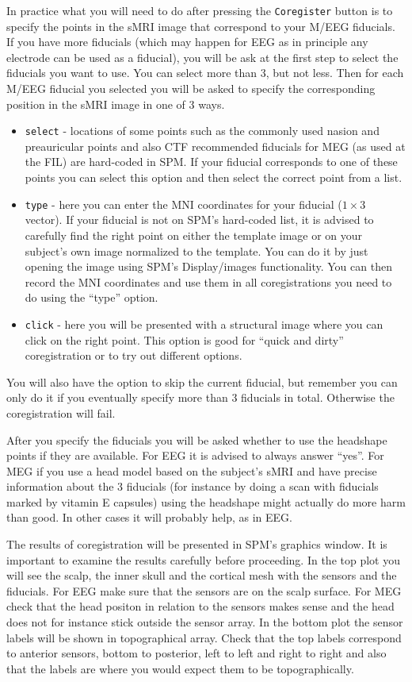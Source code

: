In practice what you will need to do after pressing  the \texttt{Coregister} button is to specify the points in the sMRI image that correspond to your M/EEG fiducials. If you have more fiducials (which may happen for EEG as in principle any electrode can be used as a fiducial), you will be ask at the first step to select the fiducials you want to use. You can select more than 3, but not less. Then for each M/EEG fiducial you selected you will be asked to specify the corresponding position in the sMRI image in one of 3 ways.

\begin{itemize}
\item \texttt{select} - locations of some points such as the commonly used nasion and preauricular points and also CTF recommended fiducials for MEG (as used at the FIL) are hard-coded in SPM. If your fiducial corresponds to one of these points you can select this option and then select the correct point from a list.
\item \texttt{type} - here you can enter the MNI coordinates for your fiducial ($1 \times 3$ vector). If your fiducial is not on SPM's hard-coded list, it is advised to carefully find the right point on either the template image or on your subject's own image normalized to the template. You can do it by just opening the image using SPM's Display/images functionality. You can then record the MNI coordinates and use them in all coregistrations you need to do using the ``type'' option.
\item \texttt{click} - here you will be presented with a structural image where you can click on the right point. This option is good for ``quick and dirty'' coregistration or to try out different options.
\end{itemize}

You will also have the option to skip the current fiducial, but remember you can only do it if you eventually specify more than 3 fiducials in total. Otherwise the coregistration will fail.

After you specify the fiducials you will be asked whether to use the headshape points if they are available. For EEG it is advised to always answer ``yes''. For MEG if you use a head model based on the subject's sMRI and have precise information about the 3 fiducials (for instance by doing a scan with fiducials marked by vitamin E capsules) using the headshape might actually do more harm than good. In other cases it will probably help, as in EEG.

The results of coregistration will be presented in SPM's graphics window. It is important to examine the results carefully before proceeding. In the top plot you will see the scalp, the inner skull and the cortical mesh with the sensors and the fiducials. For EEG make sure that the sensors are on the scalp surface. For MEG check that the head positon in relation to the sensors makes sense and the head does not for instance stick outside the sensor array. In the bottom plot the sensor labels will be shown in topographical array. Check that the top labels correspond to anterior sensors, bottom to posterior, left to left and right to right and also that the labels are where you would expect them to be topographically.

